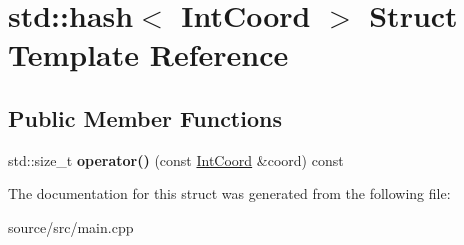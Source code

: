 \hypertarget{structstd_1_1hash_3_01_int_coord_01_4}{}\section{std\+:\+:hash$<$ Int\+Coord $>$ Struct Template Reference}
\label{structstd_1_1hash_3_01_int_coord_01_4}
\subsection*{Public Member Functions}
\begin{DoxyCompactItemize}
\item 
std\+::size\+\_\+t {\bfseries operator()} (const \hyperlink{struct_int_coord}{Int\+Coord} \&coord) const \hypertarget{structstd_1_1hash_3_01_int_coord_01_4_ab4ef7f36d5234c766c9a335679656d61}{}\label{structstd_1_1hash_3_01_int_coord_01_4_ab4ef7f36d5234c766c9a335679656d61}

\end{DoxyCompactItemize}


The documentation for this struct was generated from the following file\+:\begin{DoxyCompactItemize}
\item 
source/src/main.\+cpp\end{DoxyCompactItemize}

